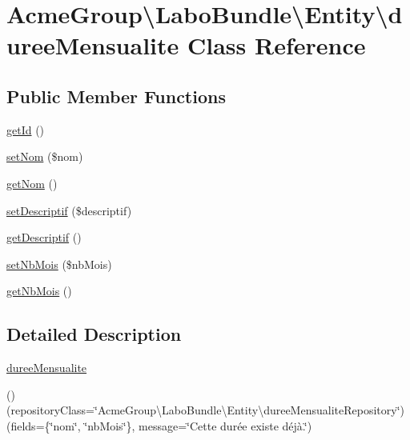 \hypertarget{class_acme_group_1_1_labo_bundle_1_1_entity_1_1duree_mensualite}{\section{Acme\+Group\textbackslash{}Labo\+Bundle\textbackslash{}Entity\textbackslash{}duree\+Mensualite Class Reference}
\label{class_acme_group_1_1_labo_bundle_1_1_entity_1_1duree_mensualite}
}
\subsection*{Public Member Functions}
\begin{DoxyCompactItemize}
\item 
\hyperlink{class_acme_group_1_1_labo_bundle_1_1_entity_1_1duree_mensualite_a46517f4629bfc89b605e488f656facb9}{get\+Id} ()
\item 
\hyperlink{class_acme_group_1_1_labo_bundle_1_1_entity_1_1duree_mensualite_a5d07a2470bd8f6df72391e72de8cf4e0}{set\+Nom} (\$nom)
\item 
\hyperlink{class_acme_group_1_1_labo_bundle_1_1_entity_1_1duree_mensualite_ac5f58c72fc04d2f951216751c85ae636}{get\+Nom} ()
\item 
\hyperlink{class_acme_group_1_1_labo_bundle_1_1_entity_1_1duree_mensualite_ad512ddde4279f44dbb1376c0da40df54}{set\+Descriptif} (\$descriptif)
\item 
\hyperlink{class_acme_group_1_1_labo_bundle_1_1_entity_1_1duree_mensualite_acc0f66b21f2424819a34f09760015d7d}{get\+Descriptif} ()
\item 
\hyperlink{class_acme_group_1_1_labo_bundle_1_1_entity_1_1duree_mensualite_a7cdb78835344a7e23cfb458dd7a6f7d7}{set\+Nb\+Mois} (\$nb\+Mois)
\item 
\hyperlink{class_acme_group_1_1_labo_bundle_1_1_entity_1_1duree_mensualite_a849d6a01d4ae37bb614a3f86f414cc1d}{get\+Nb\+Mois} ()
\end{DoxyCompactItemize}


\subsection{Detailed Description}
\hyperlink{class_acme_group_1_1_labo_bundle_1_1_entity_1_1duree_mensualite}{duree\+Mensualite}

() (repository\+Class=\char`\"{}\+Acme\+Group\textbackslash{}\+Labo\+Bundle\textbackslash{}\+Entity\textbackslash{}duree\+Mensualite\+Repository\char`\"{}) (fields=\{\char`\"{}nom\char`\"{}, \char`\"{}nb\+Mois\char`\"{}\}, message=\char`\"{}\+Cette durée existe déjà.\char`\"{}) 

